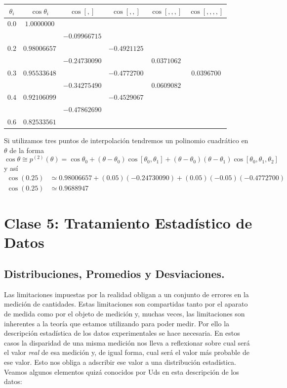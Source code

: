 \documentclass[spanish,titlepage,11pt]{article}
\begin{document}
\begin{center}%
\begin{tabular}
[c]{cccccc}\hline\hline
$\theta_{i}$ & $\cos\theta_{i}$ & $\cos\left[  ,\right]  $ & $\cos\left[
,,\right]  $ & $\cos\left[  ,,,\right]  $ & $\cos\left[  ,,,,\right]
$\\\hline\hline
$0.0$ & $1.0000000$ &  &  &  & \\
&  & $-0.09966715$ &  &  & \\
$0.2$ & $0.98006657$ &  & $-0.4921125$ &  & \\
&  & $-0.24730090$ &  & $0.0371062$ & \\
$0.3$ & $0.95533648$ &  & $-0.4772700$ &  & $0.0396700$\\
&  & $-0.34275490$ &  & $0.0609082$ & \\
$0.4$ & $0.92106099$ &  & $-0.4529067$ &  & \\
&  & $-0.47862690$ &  &  & \\
$0.6$ & $0.82533561$ &  &  &  &
\end{tabular}
\end{center}

Si utilizamos tres puntos de interpolaci\'{o}n tendremos un polinomio
cuadr\'{a}tico en $\theta$ de la forma
\[
\cos\theta\cong p^{(2)}(\theta)=\cos\theta_{0}+\left(  \theta-\theta
_{0}\right)  \cos\left[  \theta_{0},\theta_{1}\right]  +\left(  \theta
-\theta_{0}\right)  \left(  \theta-\theta_{1}\right)  \cos\left[  \theta
_{0},\theta_{1},\theta_{2}\right]
\]
y as\'{i}
\begin{align*}
\cos\left(  0.25\right)   &  \simeq0.98006657+\left(  0.05\right)  \left(
-0.24730090\right)  +\left(  0.05\right)  \left(  -0.05\right)  \left(
-0.4772700\right) \\
\cos(0.25)  &  \simeq0.9688947
\end{align*}

\newpage

\section{\textbf{Clase 5: Tratamiento Estad\'{i}stico de Datos}}

\subsection{Distribuciones, Promedios y Desviaciones.}

Las limitaciones impuestas por la realidad obligan a un conjunto de errores en
la medici\'{o}n de cantidades. Estas limitaciones son compartidas tanto por el
aparato de medida como por el objeto de medici\'{o}n y, muchas veces, las
limitaciones son inherentes a la teor\'{i}a que estamos utilizando para poder
medir. Por ello la descripci\'{o}n estad\'{i}stica de los datos experimentales
se hace necesaria. En estos casos la disparidad de una misma medici\'{o}n nos
lleva a reflexionar sobre cual ser\'{a} el valor \textit{real} de esa
medici\'{o}n y, de igual forma, cual ser\'{a} el valor m\'{a}s probable de ese
valor. Esto nos obliga a adscribir ese valor a una distribuci\'{o}n
estad\'{i}stica. Veamos algunos elementos quiz\'{a} conocidos por Uds en esta
descripci\'{o}n de los datos:
\end{document}
